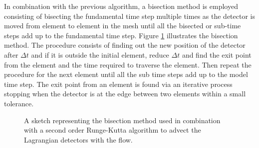 In combination with the previous algorithm, a bisection method is employed consisting of bisecting the fundamental time step multiple times as the detector is moved from element to element in the mesh until all the bisected or sub-time steps add up to the fundamental time step. Figure \ref{fig:bisection_menthod} illustrates the bisection method. The procedure consists of finding out the new position of the detector after $\Delta t$ and if it is outside the initial element, reduce $\Delta t$ and find the exit point from the element and the time required to traverse the element. Then repeat the procedure for the next element until all the sub time steps add up to the model time step. The exit point from an element is found via an iterative process stopping when the detector is at the edge between two elements within a small tolerance.
%
\begin{figure}[ht]
  \centering
  \caption{A sketch representing the bisection method used in combination with a second order Runge-Kutta algorithm to advect the Lagrangian detectors with the flow.}
  \label{fig:bisection_menthod}
\end{figure}


